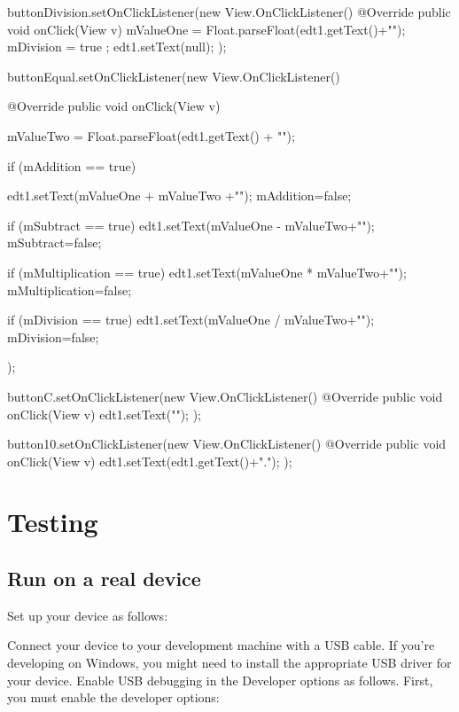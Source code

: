 \documentclass{fisatproject}
\begin{document}
{{        buttonDivision.setOnClickListener(new View.OnClickListener() {
            @Override
            public void onClick(View v) {
                mValueOne = Float.parseFloat(edt1.getText()+"");
                mDivision = true ;
                edt1.setText(null);
            }
        });
 
        buttonEqual.setOnClickListener(new View.OnClickListener() {
            @Override
            public void onClick(View v) {
                mValueTwo = Float.parseFloat(edt1.getText() + "");
 
                if (mAddition == true){
 
                    edt1.setText(mValueOne + mValueTwo +"");
                    mAddition=false;
                }
 
 
                if (mSubtract == true){
                    edt1.setText(mValueOne - mValueTwo+"");
                    mSubtract=false;
                }
 
                if (mMultiplication == true){
                    edt1.setText(mValueOne * mValueTwo+"");
                    mMultiplication=false;
                }
 
                if (mDivision == true){
                    edt1.setText(mValueOne / mValueTwo+"");
                    mDivision=false;
                }
            }
        });
 
        buttonC.setOnClickListener(new View.OnClickListener() {
            @Override
            public void onClick(View v) {
                edt1.setText("");
            }
        });
 
        button10.setOnClickListener(new View.OnClickListener() {
            @Override
            public void onClick(View v) {
                edt1.setText(edt1.getText()+".");
            }
        });
    }
 
 
 
}

\chapter{Testing}
\section{Run on a real device}
Set up your device as follows:

Connect your device to your development machine with a USB cable. If you're developing on Windows, you might need to install the appropriate USB driver for your device.
Enable USB debugging in the Developer options as follows.
First, you must enable the developer options:
\end{document}
